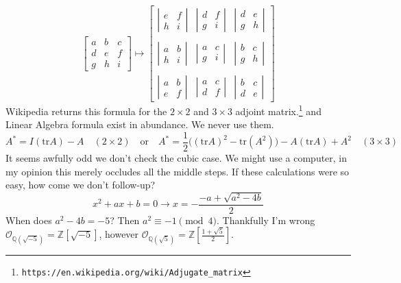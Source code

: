 \documentclass[12pt]{article}
\begin{document}
$$ \left[ \begin{array}{ccc} a & b & c \\ d & e & f \\ g & h & i\end{array} \right]
\mapsto \left[ \begin{array}{ccc} 
\left| \begin{array}{cc} e & f \\ h & i\end{array} \right|  & 
\left| \begin{array}{cc} d & f \\ g & i\end{array} \right|  & 
\left| \begin{array}{cc} d & e \\ g & h\end{array} \right|  \\ \\
\left| \begin{array}{cc} a & b \\ h & i\end{array} \right|  & 
\left| \begin{array}{cc} a & c \\ g & i\end{array} \right|  & 
\left| \begin{array}{cc} b & c \\ g & h\end{array} \right|  \\ \\
\left| \begin{array}{cc} a & b \\ e & f\end{array} \right|  & 
\left| \begin{array}{cc} a & c \\ d & f\end{array} \right|  & 
\left| \begin{array}{cc} b & c \\ d & e\end{array} \right|  \end{array} \right] $$
Wikipedia returns this formula for the $2 \times 2$ and $3 \times 3$ adjoint matrix.\footnote{\texttt{https://en.wikipedia.org/wiki/Adjugate\_{}matrix}} and Linear Algebra formula exist in abundance.  We never use them.
$$ A^* = I (\text{tr} A) - A \quad(2 \times 2)\quad\text{or}\quad A^* = \frac{1}{2}\big( (\text{tr}A)^2 - \text{tr}(A^2) \big) - A (\text{tr}A) + A^2\quad(3 \times 3) $$
It seems awfully odd we don't check the cubic case.  We might use a computer, in my opinion this merely occludes all the middle steps.  If these calculations were so easy, how come we don't follow-up?  
$$ x^2 + ax + b = 0 \to x = - \frac{-a + \sqrt{a^2 - 4b}}{2} $$
When does $a^2 - 4b = - 5$? Then $a^2 \equiv -1 \pmod 4$.  Thankfully I'm wrong $\mathcal{O}_{\mathbb{Q}(\sqrt{-5})} = \mathbb{Z}[\sqrt{-5}]$, however 
$\mathcal{O}_{\mathbb{Q}(\sqrt{5})} = \mathbb{Z}\left[\frac{1+ \sqrt{5}}{2}\right]$. 
\end{document}
